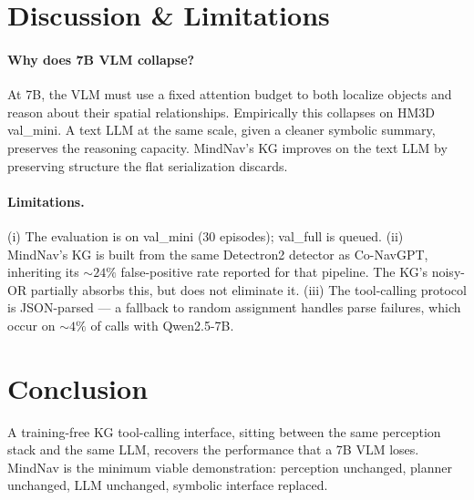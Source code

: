 \section{Discussion \& Limitations}

\paragraph{Why does 7B VLM collapse?} At 7B, the VLM must use a fixed
attention budget to both localize objects and reason about their spatial
relationships. Empirically this collapses on HM3D val\_mini. A text LLM at
the same scale, given a cleaner symbolic summary, preserves the reasoning
capacity. MindNav's KG improves on the text LLM by preserving structure the
flat serialization discards.

\paragraph{Limitations.} (i) The evaluation is on val\_mini (30 episodes);
val\_full is queued. (ii) MindNav's KG is built from the same Detectron2
detector as Co-NavGPT, inheriting its $\sim 24\%$ false-positive rate
reported for that pipeline. The KG's noisy-OR partially absorbs this, but
does not eliminate it. (iii) The tool-calling protocol is JSON-parsed ---
a fallback to random assignment handles parse failures, which occur on
$\sim 4\%$ of calls with Qwen2.5-7B.

\section{Conclusion}
A training-free KG tool-calling interface, sitting between the same
perception stack and the same LLM, recovers the performance that a 7B VLM
loses. MindNav is the minimum viable demonstration: perception unchanged,
planner unchanged, LLM unchanged, symbolic interface replaced.
